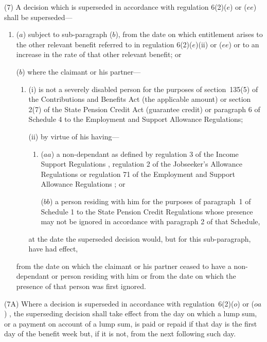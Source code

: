 \documentclass[12pt,a4paper]{article}
\begin{document}
(7) A decision which is superseded in accordance with regulation 6(2)($e$)  or ($ee$)  shall be superseded—
\begin{enumerate}\item[]
($a$) subject to sub-paragraph ($b$), from the date on which entitlement arises to the other relevant benefit referred to in regulation 6(2)($e$)(ii)  or ($ee$)  or to an increase in the rate of that other relevant benefit; or

($b$) where the claimant or his partner—
\begin{enumerate}\item[]
(i) is not a severely disabled person for the purposes of section~135(5) of the Contributions and Benefits Act (the applicable amount) or section 2(7) of the State Pension Credit Act (guarantee credit)
or paragraph 6 of Schedule 4 to the Employment and Support Allowance Regulations;  %

(ii) by virtue of his having—
\begin{enumerate}\item[]
($aa$) a non-dependant as defined by regulation 3 of the Income Support Regulations%
, regulation 2 of the Jobseeker’s Allowance Regulations  %
or regulation 71 of the Employment and Support Allowance Regulations%
; or

($bb$) a person residing with him for the purposes of paragraph~1 of Schedule 1 to the State Pension Credit Regulations whose presence may not be ignored in accordance with paragraph 2 of that Schedule,
\end{enumerate}
at the date the superseded decision would, but for this sub-paragraph, have had effect,
\end{enumerate}
from the date on which the claimant or his partner ceased to have a non-dependant or person residing with him or from the date on which the presence of that person was first ignored.
\end{enumerate}

\begin{sloppypar}
(7A) Where a decision is superseded in accordance with regulation~6(2)($o$)
or ($oa$)%
, the superseding decision shall take effect from the day on which a lump sum, or a payment on account of a lump sum, is paid or repaid if that day is the first day of the benefit week but, if it is not, from the next following such day.
\end{sloppypar}
\end{document}
